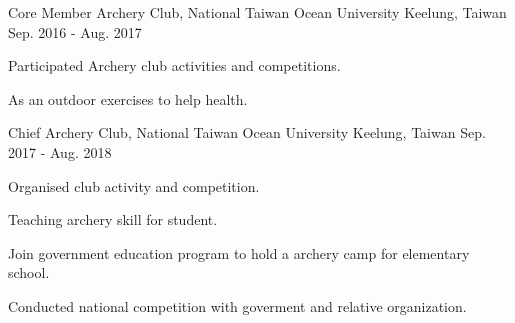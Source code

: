 

\begin{cventries}

  \cventry
    {Core Member  } %
    {Archery Club, National Taiwan Ocean University} %
    {Keelung, Taiwan} %
    {Sep. 2016 - Aug. 2017} %
    {
      \begin{cvitems} %
        \item {Participated Archery club activities and competitions.}
        \item {As an outdoor exercises to help health.}
      \end{cvitems}
    }

  \cventry
    {Chief} %
    {Archery Club, National Taiwan Ocean University} %
    {Keelung, Taiwan} %
    {Sep. 2017 - Aug. 2018} %
    {
      \begin{cvitems} %
        \item {Organised club activity and competition.}
        \item {Teaching archery skill for student.}
        \item {Join government education program to hold a archery camp for elementary school.}
        \item {Conducted national competition with goverment and relative organization.}
      \end{cvitems}
    }

\end{cventries}
